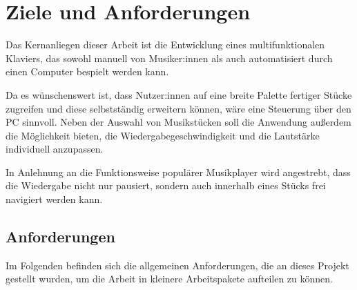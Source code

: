 \chapter{Ziele und Anforderungen} \label{Zielstellung}

\nocite{*}


Das Kernanliegen dieser Arbeit ist die Entwicklung eines multifunktionalen Klaviers,
das sowohl manuell von Musiker:innen als auch automatisiert durch einen Computer bespielt werden kann.

Da es wünschenswert ist, dass Nutzer:innen auf eine breite Palette fertiger Stücke zugreifen und diese selbstständig erweitern können,
wäre eine Steuerung über den PC sinnvoll.
Neben der Auswahl von Musikstücken soll die Anwendung außerdem die Möglichkeit bieten,
die Wiedergabegeschwindigkeit und die Lautstärke individuell anzupassen.

In Anlehnung an die Funktionsweise populärer Musikplayer wird angestrebt,
dass die Wiedergabe nicht nur pausiert, sondern auch innerhalb eines Stücks frei navigiert werden kann.

\newpage

\section{Anforderungen} \label{sec:zielstellung-anforderungen}

Im Folgenden befinden sich die allgemeinen Anforderungen, die an dieses Projekt gestellt wurden,
um die Arbeit in kleinere Arbeitspakete aufteilen zu können.


